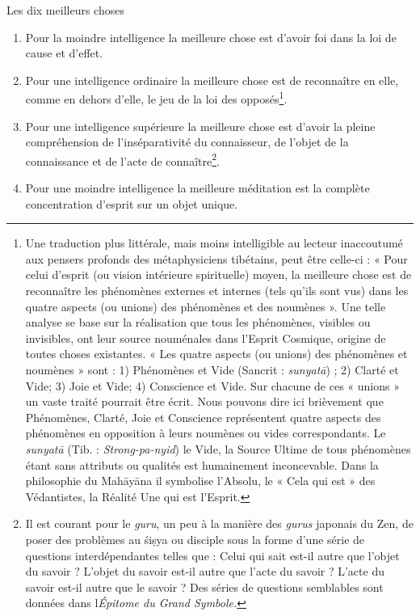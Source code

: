 \documentclass[10pt]{book}
\makeatletter
\renewcommand{\section}{\@startsection{section}{0}{0mm}
   {\baselineskip}
   {\baselineskip}{\normalfont\normalsize\scshape\centering}
}
\makeatother
\begin{document}
\section{Les dix meilleurs choses}
\begin{enumerate}[1.-]
\item Pour la moindre intelligence la meilleure chose est d'avoir foi dans la loi de cause et d'effet.
\item Pour une intelligence ordinaire la meilleure chose est de reconnaître en elle, comme en dehors d'elle, le jeu de la loi des opposés\footnote{Une traduction plus littérale, mais moins intelligible au lecteur inaccoutumé aux pensers profonds des métaphysiciens tibétains, peut être celle-ci : « Pour celui d'esprit (ou vision intérieure spirituelle) moyen, la meilleure chose est de reconnaître les phénomènes externes et internes (tels qu'ils sont vus) dans les quatre aspects (ou unions) des phénomènes et des noumènes ». Une telle analyse se base sur la réalisation que tous les phénomènes, visibles ou invisibles, ont leur source nouménales dans l'Esprit Cosmique, origine de toutes choses existantes. « Les quatre aspects (ou unions) des phénomènes et noumènes » sont : 1) Phénomènes et Vide (Sancrit : \textit{sunyatā}) ; 2) Clarté et Vide; 3) Joie et Vide; 4) Conscience et Vide. Sur chacune de ces « unions » un vaste traité pourrait être écrit. Nous pouvons dire ici brièvement que Phénomènes, Clarté, Joie et Conscience représentent quatre aspects des phénomènes en opposition à leurs noumènes ou vides correspondants. Le \textit{sunyatā} (Tib. : \textit{Strong-pa-nyid}) le Vide, la Source Ultime de tous phénomènes étant sans attributs ou qualités est humainement inconcevable. Dans la philosophie du Mahāyāna il symbolise l'Absolu, le « Cela qui est » des Védantistes, la Réalité Une qui est l'Esprit.}.
\item Pour une intelligence supérieure la meilleure chose est d'avoir la pleine compréhension de l'inséparativité du connaisseur, de l'objet de la connaissance et de l'acte de connaître\footnote{Il est courant pour le \textit{guru}, un peu à la manière des \textit{gurus} japonais du Zen, de poser des problèmes au śiṣya ou disciple sous la forme d'une série de questions interdépendantes telles que : Celui qui sait est-il autre que l'objet du savoir ? L'objet du savoir est-il autre que l'acte du savoir ? L'acte du savoir est-il autre que le savoir ? Des séries de questions semblables sont données dans l\textit{Épitome du Grand Symbole.}}.
\item Pour une moindre intelligence la meilleure méditation est la complète concentration d'esprit sur un objet unique.

\end{enumerate}
\end{document}
